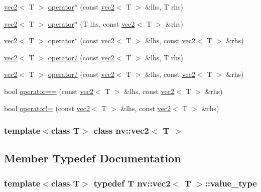\begin{CompactItemize}
\hyperlink{classnv_1_1vec2}{vec2}$<$ T $>$ \hyperlink{classnv_1_1vec2_cf094661268a6716a0838effa711d5fd}{operator$\ast$} (const \hyperlink{classnv_1_1vec2}{vec2}$<$ T $>$ \&lhs, T rhs)
\item 
\hyperlink{classnv_1_1vec2}{vec2}$<$ T $>$ \hyperlink{classnv_1_1vec2_0d9aa669bcd9d0c4217f0be882e95bc6}{operator$\ast$} (T lhs, const \hyperlink{classnv_1_1vec2}{vec2}$<$ T $>$ \&rhs)
\item 
\hyperlink{classnv_1_1vec2}{vec2}$<$ T $>$ \hyperlink{classnv_1_1vec2_bfa3883153adec88b629071d6214181c}{operator$\ast$} (const \hyperlink{classnv_1_1vec2}{vec2}$<$ T $>$ \&lhs, const \hyperlink{classnv_1_1vec2}{vec2}$<$ T $>$ \&rhs)
\item 
\hyperlink{classnv_1_1vec2}{vec2}$<$ T $>$ \hyperlink{classnv_1_1vec2_20e8cedd23c85b5a733b29d9216823eb}{operator/} (const \hyperlink{classnv_1_1vec2}{vec2}$<$ T $>$ \&lhs, T rhs)
\item 
\hyperlink{classnv_1_1vec2}{vec2}$<$ T $>$ \hyperlink{classnv_1_1vec2_2ad71189de611e357baac7c2166f10cd}{operator/} (const \hyperlink{classnv_1_1vec2}{vec2}$<$ T $>$ \&lhs, const \hyperlink{classnv_1_1vec2}{vec2}$<$ T $>$ \&rhs)
\item 
bool \hyperlink{classnv_1_1vec2_783e39d62df5ebca6654640dd95b6f54}{operator==} (const \hyperlink{classnv_1_1vec2}{vec2}$<$ T $>$ \&lhs, const \hyperlink{classnv_1_1vec2}{vec2}$<$ T $>$ \&rhs)
\item 
bool \hyperlink{classnv_1_1vec2_996c39a11242ad1431131ab6cf71e383}{operator!=} (const \hyperlink{classnv_1_1vec2}{vec2}$<$ T $>$ \&lhs, const \hyperlink{classnv_1_1vec2}{vec2}$<$ T $>$ \&rhs)
\end{CompactItemize}
\subsubsection*{template$<$class T$>$ class nv::vec2$<$ T $>$}



\subsection{Member Typedef Documentation}
\hypertarget{classnv_1_1vec2_3d3474ed0b0c4f8cbe07a262ced84b63}{
\subsubsection[{value\_\-type}]{\setlength{\rightskip}{0pt plus 5cm}template$<$class T$>$ typedef T {\bf nv::vec2}$<$ T $>$::{\bf value\_\-type}}}
\label{classnv_1_1vec2_3d3474ed0b0c4f8cbe07a262ced84b63}




